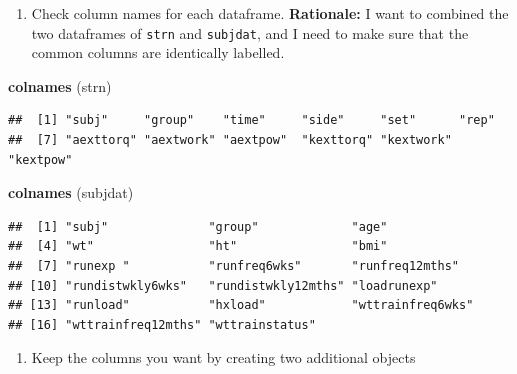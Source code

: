 \documentclass[
]{book}
\newenvironment{Shaded}{\begin{snugshade}}{\end{snugshade}}
\newcommand{\CommentTok}[1]{\textcolor[rgb]{0.56,0.35,0.01}{\textit{#1}}}
\newcommand{\DataTypeTok}[1]{\textcolor[rgb]{0.13,0.29,0.53}{#1}}
\newcommand{\KeywordTok}[1]{\textcolor[rgb]{0.13,0.29,0.53}{\textbf{#1}}}
\newcommand{\NormalTok}[1]{#1}
\newcommand{\OperatorTok}[1]{\textcolor[rgb]{0.81,0.36,0.00}{\textbf{#1}}}
\newcommand{\StringTok}[1]{\textcolor[rgb]{0.31,0.60,0.02}{#1}}
\providecommand{\tightlist}{%
  \setlength{\itemsep}{0pt}\setlength{\parskip}{0pt}}
\begin{document}
\begin{enumerate}
\def\labelenumi{\arabic{enumi}.}
\setcounter{enumi}{1}
\tightlist
\item
  Check column names for each dataframe. \textbf{Rationale:} I want to combined the two dataframes of \texttt{strn} and \texttt{subjdat}, and I need to make sure that the common columns are identically labelled.
\end{enumerate}

\begin{Shaded}
\begin{Highlighting}[]
\KeywordTok{colnames}\NormalTok{ (strn) }
\end{Highlighting}
\end{Shaded}

\begin{verbatim}
##  [1] "subj"     "group"    "time"     "side"     "set"      "rep"     
##  [7] "aexttorq" "aextwork" "aextpow"  "kexttorq" "kextwork" "kextpow"
\end{verbatim}

\begin{Shaded}
\begin{Highlighting}[]
\KeywordTok{colnames}\NormalTok{ (subjdat)}
\end{Highlighting}
\end{Shaded}

\begin{verbatim}
##  [1] "subj"              "group"             "age"              
##  [4] "wt"                "ht"                "bmi"              
##  [7] "runexp "           "runfreq6wks"       "runfreq12mths"    
## [10] "rundistwkly6wks"   "rundistwkly12mths" "loadrunexp"       
## [13] "runload"           "hxload"            "wttrainfreq6wks"  
## [16] "wttrainfreq12mths" "wttrainstatus"
\end{verbatim}

\begin{enumerate}
\def\labelenumi{\arabic{enumi}.}
\setcounter{enumi}{2}
\tightlist
\item
  Keep the columns you want by creating two additional objects
\end{enumerate}

\begin{Shaded}
\end{Shaded}
\end{document}

